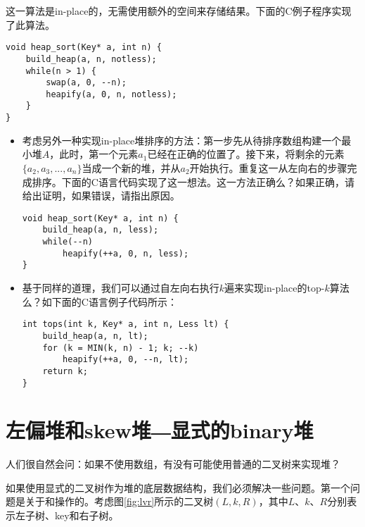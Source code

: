 \documentclass[UTF8]{article}
\begin{document}
这一算法是in-place的，无需使用额外的空间来存储结果。下面的C例子程序实现了此算法。

\lstset{language=C}
\begin{lstlisting}
void heap_sort(Key* a, int n) {
    build_heap(a, n, notless);
    while(n > 1) {
        swap(a, 0, --n);
        heapify(a, 0, n, notless);
    }
}
\end{lstlisting}

\begin{Exercise}
\begin{itemize}
\item 考虑另外一种实现in-place堆排序的方法：第一步先从待排序数组构建一个最小堆$A$，此时，第一个元素$a_1$已经在正确的位置了。接下来，将剩余的元素$\{a_2, a_3, ..., a_n\}$当成一个新的堆，并从$a_2$开始执行。重复这一从左向右的步骤完成排序。下面的C语言代码实现了这一想法。这一方法正确么？如果正确，请给出证明，如果错误，请指出原因。
\lstset{language=C}
\begin{lstlisting}
void heap_sort(Key* a, int n) {
    build_heap(a, n, less);
    while(--n)
        heapify(++a, 0, n, less);
}
\end{lstlisting}

\item 基于同样的道理，我们可以通过自左向右执行$k$遍来实现in-place的top-$k$算法么？如下面的C语言例子代码所示：
\lstset{language=C}
\begin{lstlisting}
int tops(int k, Key* a, int n, Less lt) {
    build_heap(a, n, lt);
    for (k = MIN(k, n) - 1; k; --k)
        heapify(++a, 0, --n, lt);
    return k;
}
\end{lstlisting}
\end{itemize}
\end{Exercise}

\section{左偏堆和skew堆―显式的binary堆}
\label{ebheap}

人们很自然会问：如果不使用数组，有没有可能使用普通的二叉树来实现堆？

如果使用显式的二叉树作为堆的底层数据结构，我们必须解决一些问题。第一个问题是关于和操作的。考虑图\ref{fig:lvr}所示的二叉树$(L, k, R)$，其中$L$、$k$、$R$分别表示左子树、key和右子树。
\end{document}
